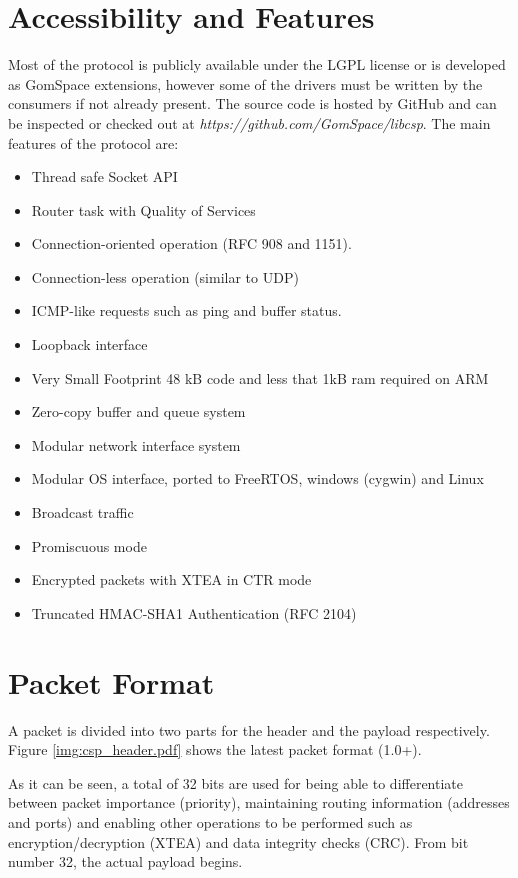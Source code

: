 \section{Accessibility and Features}
Most of the protocol is publicly available under the LGPL license or is developed as GomSpace extensions, however some of the drivers must be written by the consumers if not already present. The source code is hosted by GitHub and can be inspected or checked out at \textit{https://github.com/GomSpace/libcsp}. The main features of the protocol are:

\begin{itemize}
	\item Thread safe Socket API
	\item Router task with Quality of Services
	\item Connection-oriented operation (RFC 908 and 1151).
	\item Connection-less operation (similar to UDP)
	\item ICMP-like requests such as ping and buffer status.
	\item Loopback interface
	\item Very Small Footprint 48 kB code and less that 1kB ram required on ARM
	\item Zero-copy buffer and queue system
	\item Modular network interface system
	\item Modular OS interface, ported to FreeRTOS, windows (cygwin) and Linux
	\item Broadcast traffic
	\item Promiscuous mode
	\item Encrypted packets with XTEA in CTR mode
	\item Truncated HMAC-SHA1 Authentication (RFC 2104)
\end{itemize}

\section{Packet Format}
A packet is divided into two parts for the header and the payload respectively. Figure \ref{img:csp_header.pdf} shows the latest packet format (1.0+).


As it can be seen, a total of 32 bits are used for being able to differentiate between packet importance (priority), maintaining routing information (addresses and ports) and enabling other operations to be performed such as encryption/decryption (XTEA) and data integrity checks (CRC). From bit number 32, the actual payload begins.

